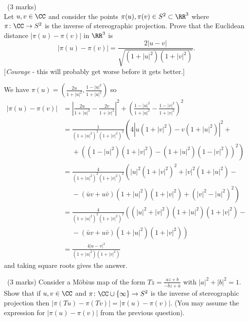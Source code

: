 \documentclass[12pt]{article}
\begin{document}
\newpage

\begin{question}\ (3 marks)\\
  Let $u,v\in\CC$ and consider the points $\pi(u),\pi(v)\in S^2\subset\RR^3$ where $\pi\colon\CC\to S^2$ is the inverse of stereographic projection. Prove that the Euclidean distance $|\pi(u)-\pi(v)|$ in $\RR^3$ is
  \[|\pi(u)-\pi(v)|=\frac{2|u-v|}{\sqrt{(1+|u|^2)(1+|v|^2)}}.\]
  [{\em Courage} - this will probably get worse before it gets better.]
\end{question}

\begin{answer}
  We have $\pi(u)=\left(\frac{2u}{1+|u|^2},\frac{1-|u|^2}{1+|u|^2}\right)$ so
  \begin{align*}
    |\pi(u)-\pi(v)|&=\left|\frac{2u}{1+|u|^2}-\frac{2v}{1+|v|^2}\right|^2+\left(\frac{1-|u|^2}{1+|u|^2}-\frac{1-|v|^2}{1+|v|^2}\right)^2\\
    &=\frac{1}{(1+|u|^2)^2(1+|v|^2)^2}\left(4\left|u(1+|v|^2)-v(1+|u|^2)\right|^2+\right.\\
    &\left.\ \ \ \ \ \ +\left((1-|u|^2)(1+|v|^2)-(1+|u|^2)(1-|v|^2)\right)^2\right)\\
    &=\frac{4}{(1+|u|^2)^2(1+|v|^2)^2}\left(|u|^2(1+|v|^2)^2+|v|^2(1+|u|^2)-\right.\\
    &\left.\ \ \ \ \ \ -(\bar{u}v+u\bar{v})(1+|u|^2)(1+|v|^2)+\left(|v|^2-|u|^2\right)^2\right)\\
    &=\frac{4}{(1+|u|^2)^2(1+|v|^2)^2}\left((|u|^2+|v|^2)(1+|u|^2)(1+|v|^2)-\right.\\
    &\left.\ \ \ \ \ \ -(\bar{u}v+u\bar{v})(1+|u|^2)(1+|v|^2)\right)\\
    &=\frac{4|u-v|^2}{(1+|u|^2)(1+|v|^2)}
  \end{align*}
  and taking square roots gives the answer.
\end{answer}
\newpage

\vspace{1cm}

\begin{question}\ (3 marks)
Consider a M\"obius map of the form $Tz=\frac{az+b}{-\bar{b}z+\bar{a}}$ with $|a|^2+|b|^2=1$. Show that if $u,v\in\CC$ and $\pi\colon\CC\cup\{\infty\}\to S^2$ is the inverse of stereographic projection then $|\pi(Tu)-\pi(Tv)|=|\pi(u)-\pi(v)|$. (You may assume the expression for $|\pi(u)-\pi(v)|$ from the previous question).
\end{question}
\end{document}
